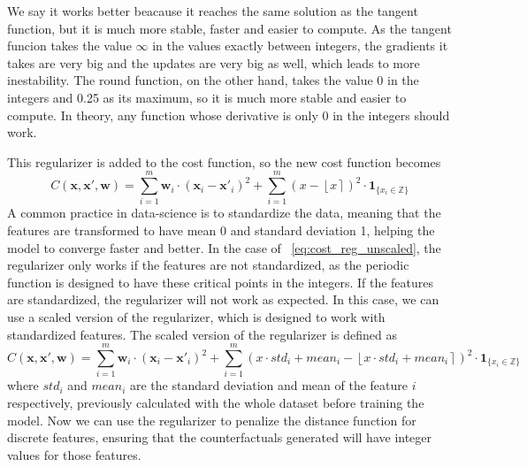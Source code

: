 \documentclass[12pt]{extarticle}
\numberwithin{equation}{section}
\begin{document}
We say it works better beacause it reaches the same solution as the tangent function, but it is much more stable, faster and easier to compute. As the tangent funcion takes the value $\infty$ in the values exactly between integers, the gradients it takes are very big and the updates are very big as well, which leads to more inestability. The round function, on the other hand, takes the value 0 in the integers and 0.25 as its maximum, so it is much more stable and easier to compute. In theory, any function whose derivative is only 0 in the integers should work.

This regularizer is added to the cost function, so the new cost function becomes
\begin{equation}\label{eq:cost_reg_unscaled}
    C(\mathbf{x}, \mathbf{x}', \mathbf{w}) = \sum_{i=1}^{m} \mathbf{w}_i \cdot (\mathbf{x}_i - \mathbf{x}'_{i})^2 + \sum_{i=1}^{m} (x - \left\lfloor x \right\rceil )^2 \cdot \mathbf{1}_{\{x_{i}\in\mathbb{Z}\}}
\end{equation}
A common practice in data-science is to standardize the data, meaning that the features are transformed to have mean 0 and standard deviation 1, helping the model to converge faster and better. In the case of ~\eqref{eq:cost_reg_unscaled}, the regularizer only works if the features are not standardized, as the periodic function is designed to have these critical points in the integers. If the features are standardized, the regularizer will not work as expected. In this case, we can use a scaled version of the regularizer, which is designed to work with standardized features. The scaled version of the regularizer is defined as
\begin{equation}\label{eq:cost_reg_scaled}
    C(\mathbf{x}, \mathbf{x}', \mathbf{w}) = \sum_{i=1}^{m} \mathbf{w}_i \cdot (\mathbf{x}_i - \mathbf{x}'_{i})^2 + \sum_{i=1}^{m} (x \cdot std_i + mean_i - \left\lfloor x \cdot std_i + mean_i \right\rceil )^2 \cdot \mathbf{1}_{\{x_{i}\in\mathbb{Z}\}}
\end{equation}
where \(std_i\) and \(mean_i\) are the standard deviation and mean of the feature \(i\) respectively, previously calculated with the whole dataset before training the model. Now we can use the regularizer to penalize the distance function for discrete features, ensuring that the counterfactuals generated will have integer values for those features.
\end{document}
